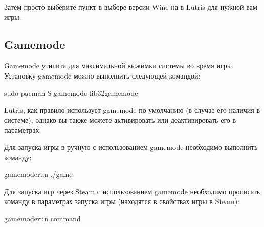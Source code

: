 \documentclass[letterpaper,10pt,russian,openany]{sphinxmanual}
\begin{document}
\sphinxAtStartPar
Затем просто выберите пункт в выборе версии Wine на  в Lutris для нужной вам игры.

\ignorespaces 

\subsection{Gamemode}
\label{\detokenize{source/linux-gaming:gamemode}}\label{\detokenize{source/linux-gaming:index-16}}\label{\detokenize{source/linux-gaming:id12}}
\sphinxAtStartPar
Gamemode \sphinxhyphen{} утилита для максимальной выжимки системы во время игры.
Установку gamemode можно выполнить следующей командой:

\begin{sphinxVerbatim}[commandchars=\\\{\}]
sudo pacman \PYGZhy{}S gamemode lib32\PYGZhy{}gamemode
\end{sphinxVerbatim}

\sphinxAtStartPar
Lutris, как правило использует gamemode по умолчанию (в случае его наличия в системе), однако вы также можете активировать или деактивировать его в параметрах.

\sphinxAtStartPar
Для запуска игры в ручную с использованием gamemode необходимо выполнить команду:

\begin{sphinxVerbatim}[commandchars=\\\{\}]
gamemoderun ./game
\end{sphinxVerbatim}

\sphinxAtStartPar
Для запуска игр через Steam с использованием gamemode необходимо прописать команду в параметрах запуска игры (находятся в свойствах игры в Steam):

\begin{sphinxVerbatim}[commandchars=\\\{\}]
gamemoderun \PYGZpc{}command\PYGZpc{}
\end{sphinxVerbatim}

\ignorespaces 
\end{document}
